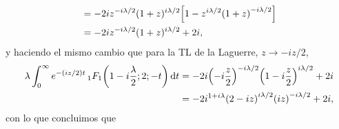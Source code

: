 \documentclass[%
 aip,
 jmp,%
 amsmath,amssymb,
 reprint,%
]{revtex4-2}
\begin{document}
{\begin{equation}
\begin{aligned}
    &=-2iz^{-i\lambda/2}(1+z)^{i\lambda/2}\qty[1-z^{i\lambda/2}\qty(1+z)^{-i\lambda/2}]\\
    &=-2iz^{-i\lambda/2}(1+z)^{i\lambda/2}+2i,
\end{aligned}
\end{equation}
y haciendo el mismo cambio que para la TL de la Laguerre, $z\to -iz/2$,
\begin{equation}
\begin{aligned}
    \lambda\int_0^\infty e^{-(iz/2)t}\,_1F_1\qty(1-i\frac{\lambda}{2};2;-t)\dd{t}&=-2i\qty(-i\frac{z}{2})^{-i\lambda/2}\qty(1-i\frac{z}{2})^{i\lambda/2}+2i\\
    &=-2i^{1+i\lambda} \qty(2-iz)^{i\lambda/2}\qty(iz)^{-i\lambda/2}+2i,
\end{aligned}
\end{equation}
con lo que concluimos que
\begin{equation}
    [\text{tomar transformada inversa haciendo el cambio de variable de } t]
\end{equation}
}

\nocite{*}
\end{document}
